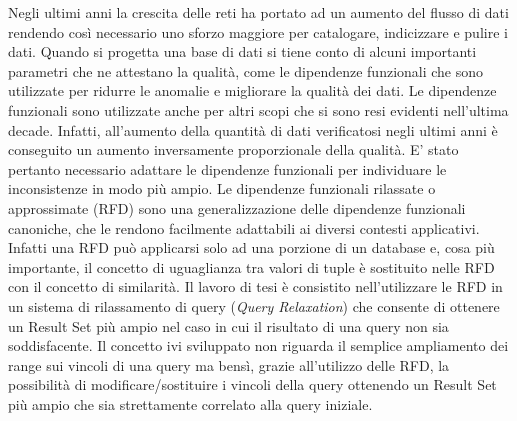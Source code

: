 Negli ultimi anni la crescita delle reti ha portato ad un aumento del flusso di dati rendendo così necessario uno sforzo maggiore per catalogare, indicizzare e pulire i dati. 
Quando si progetta una base di dati si tiene conto di alcuni importanti parametri che ne attestano la qualità, come le dipendenze funzionali che sono utilizzate per ridurre le anomalie e migliorare la qualità dei dati.
Le dipendenze funzionali sono utilizzate anche per altri scopi che si sono resi evidenti nell’ultima decade. Infatti,  all’aumento della quantità di dati verificatosi negli ultimi anni è conseguito un aumento inversamente proporzionale della qualità. E' stato pertanto necessario adattare le dipendenze funzionali per individuare le inconsistenze in modo più ampio.
Le dipendenze funzionali rilassate o approssimate (RFD) sono una generalizzazione delle dipendenze funzionali canoniche,  che le rendono facilmente adattabili ai diversi contesti applicativi. Infatti una RFD può applicarsi solo ad una porzione di un database e, cosa più importante, il concetto di uguaglianza tra valori di tuple è sostituito nelle RFD  con il concetto di similarità. 
Il lavoro di tesi è consistito nell’utilizzare le RFD in un sistema di rilassamento di query (\emph{Query Relaxation}) che consente di ottenere un Result Set più ampio nel caso in cui il risultato di una query non sia soddisfacente.
Il concetto ivi sviluppato non riguarda il semplice ampliamento dei range sui vincoli di una query ma bensì, grazie all'utilizzo delle RFD, la possibilità di modificare/sostituire i vincoli della query ottenendo un Result Set più ampio che sia strettamente correlato alla query iniziale.